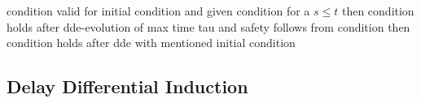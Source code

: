 \documentclass[10pt]{report}
\begin{document}
            condition valid for initial condition and given condition for a $s\leq t$ then condition holds after dde-evolution of max time tau and safety follows from condition then condition holds after dde with mentioned initial condition

            \begin{calculus}
            \end{calculus}

        \subsection{Delay Differential Induction}
            \label{sec:delay-differential-induction}

            \begin{calculus}
            \end{calculus}
\end{document}
